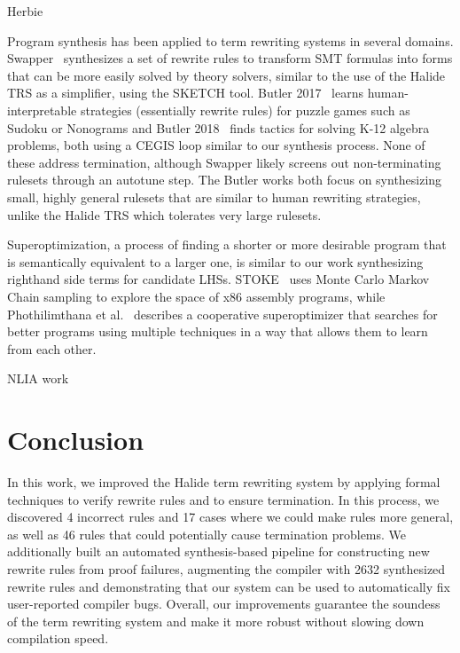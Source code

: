 \documentclass[sigplan,10pt,review,anonymous]{acmart}\settopmatter{printfolios=true,printccs=false,printacmref=false}
\newcommand{\NumRulesFixed}{{\color{red} 4}\xspace}
\newcommand{\NumPredicatesRelaxed}{{\color{red} 17}\xspace}
\newcommand{\NumOrderingProblems}{{\color{red} 46}\xspace}
\newcommand{\NumRulesSynthesized}{{\color{red} 2632}\xspace}
\begin{document}
Herbie~\cite{panchekha2015automatically}

Program synthesis has been applied to term rewriting systems in several domains. Swapper~\cite{singh2016swapper} synthesizes a set of rewrite rules to transform SMT formulas into forms that can be more easily solved by theory solvers, similar to the use of the Halide TRS as a simplifier, using the SKETCH tool. Butler 2017~\cite{butler2017synthesizing} learns human-interpretable strategies (essentially rewrite rules) for puzzle games such as Sudoku or Nonograms and Butler 2018~\cite{butler2018framework} finds tactics for solving K-12 algebra problems, both using a CEGIS loop similar to our synthesis process. None of these address termination, although Swapper likely screens out non-terminating rulesets through an autotune step. The Butler works both focus on synthesizing small, highly general rulesets that are similar to human rewriting strategies, unlike the Halide TRS which tolerates very large rulesets.

Superoptimization, a process of finding a shorter or more desirable program that is semantically equivalent to a larger one, is similar to our work synthesizing righthand side terms for candidate LHSs. STOKE~\cite{schkufza2013stochastic} uses Monte Carlo Markov Chain sampling to explore the space of x86 assembly programs, while Phothilimthana et al.~\cite{phothilimthana2016scaling} describes a cooperative superoptimizer that searches for better programs using multiple techniques in a way that allows them to learn from each other. 



NLIA work~\cite{jovanovic2017solving}

\section{Conclusion}
In this work, we improved the Halide term rewriting system by applying formal
techniques to verify rewrite rules and to ensure termination.  In this process,
we discovered \NumRulesFixed incorrect rules and \NumPredicatesRelaxed cases
where we could make rules more general, as well as \NumOrderingProblems rules
that could potentially cause termination problems.  We additionally built
an automated synthesis-based pipeline for constructing new rewrite rules from
proof failures, augmenting the compiler with \NumRulesSynthesized synthesized
rewrite rules and demonstrating that our system can be used to automatically fix
user-reported compiler bugs. Overall, our improvements guarantee the soundess of the term rewriting system and make it more robust  without slowing down compilation speed.
\end{document}

